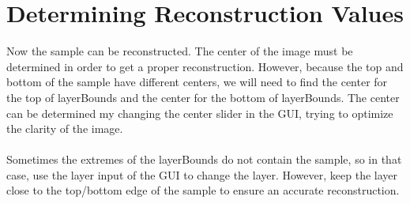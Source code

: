 \documentclass[10pt]{article}
\begin{document}
\section{Determining Reconstruction Values}
Now the sample can be reconstructed. The center of the image must be determined in order to get a proper reconstruction.
However, because the top and bottom of the sample have different centers, we will need to find the center for the top of 
layerBounds and the center for the bottom of layerBounds. The center can be determined my changing the center slider in the GUI,
trying to optimize the clarity of the image.\\\\
Sometimes the extremes of the layerBounds do not contain the sample, so in that case, use the layer input of the GUI to change the layer.
However, keep the layer close to the top/bottom edge of the sample to ensure an accurate reconstruction.\\
\end{document}

